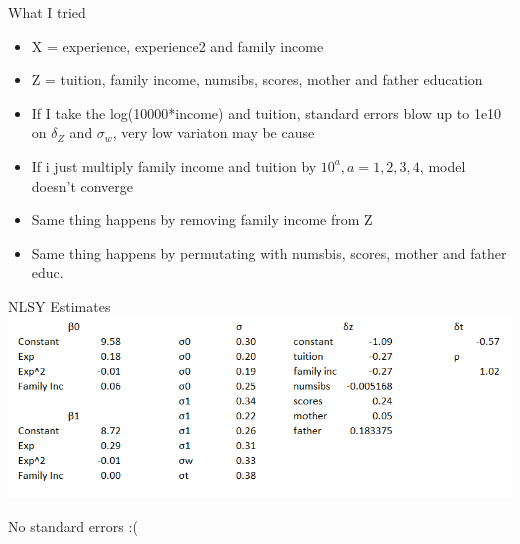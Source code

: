 \documentclass{beamer}
\begin{document}
\begin{frame}{What I tried}
\begin{itemize}
\item X = experience, experience2 and family income
\item Z = tuition, family income, numsibs, scores, mother and father education
\item If I take the log(10000*income) and tuition, standard errors blow up to 1e10 on $\delta_Z$ and $\sigma_w$, very low variaton may be cause
\item If i just multiply family income and tuition by $10^a, a=1,2,3,4$, model doesn't converge
\item Same thing happens by removing family income from Z
\item Same thing happens by permutating with numsbis, scores, mother and father educ.
\end{itemize}
\end{frame}


\begin{frame}{NLSY Estimates}
\centering
\includegraphics[scale=0.59]{nlsy_est.png}

No standard errors :(
\end{frame}
\end{document}
